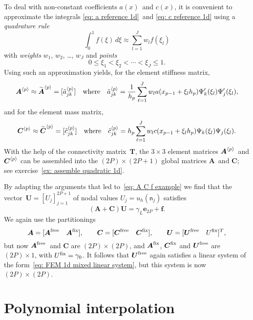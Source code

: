 To deal with non-constant coefficients $a(x)$~and $c(x)$, it is convenient to 
approximate the integrals \eqref{eq: a reference 1d}~and
\eqref{eq: c reference 1d} using a \emph{quadrature rule}
\[
\int_0^1 f(\xi)\,d\xi\approx\sum_{l=1}^J w_lf(\xi_l)
\]
with \emph{weights} $w_1$, $w_2$, \dots, $w_J$ and \emph{points}
\[
0\le\xi_1<\xi_2<\cdots<\xi_J\le1.
\]
Using such an approximation yields, for the element stiffness matrix,
\[
\boldsymbol{A}^{\langle p\rangle}\approx
	\widetilde{\boldsymbol{A}}^{\langle p\rangle}=[\tilde a_{jk}^{\langle p\rangle}]
\quad\text{where}\quad
\tilde a^{\langle p\rangle}_{jk}=\frac{1}{h_p}\sum_{\ell=1}^Jw_la(x_{p-1}+\xi_lh_p)
	\Psi'_k(\xi_l)\Psi'_j(\xi_l),
\]
and for the element mass matrix,
\[
\boldsymbol{C}^{\langle p\rangle}\approx
	\widetilde{\boldsymbol{C}}^{\langle p\rangle}=[\tilde c_{jk}^{\langle p\rangle}]
\quad\text{where}\quad
\tilde c^{\langle p\rangle}_{jk}=h_p\sum_{\ell=1}^Jw_lc(x_{p-1}+\xi_lh_p)
	\Psi_k(\xi_l)\Psi_j(\xi_l).
\]
With the help of the connectivity matrix~$\boldsymbol{T}$, the $3\times3$ 
element matrices $\boldsymbol{A}^{\langle p\rangle}$~and $\boldsymbol{C}^{\langle p\rangle}$ can be 
assembled into the $(2P)\times(2P+1)$ global matrices $\boldsymbol{A}$~and 
$\boldsymbol{C}$; see exercise~\ref{ex: assemble quadratic 1d}.

By adapting the arguments that led to~\eqref{eq: A C f example} we find that
the vector~$\boldsymbol{U}=[U_j]_{j=1}^{2P+1}$ of nodal values
$U_j=u_h(\mathsf{n}_j)$ satisfies
\[
(\boldsymbol{A}+\boldsymbol{C})\boldsymbol{U}
	=\gamma_L\boldsymbol{e}_{2P}+\boldsymbol{f}.
\]
We again use the partitionings
\[
\boldsymbol{A}=[\boldsymbol{A}^{\mathrm{free}}\quad\boldsymbol{A}^{\mathrm{fix}}],\qquad
\boldsymbol{C}=[\boldsymbol{C}^{\mathrm{free}}\quad\boldsymbol{C}^{\mathrm{fix}}],\qquad
\boldsymbol{U}=[\boldsymbol{U}^{\mathrm{free}}\quad U^{\mathrm{fix}}]^T,
\]
but now $\boldsymbol{A}^{\mathrm{free}}$~and $\boldsymbol{C}$ are $(2P)\times(2P)$, and
$\boldsymbol{A}^{\mathrm{fix}}$, $\boldsymbol{C}^{\mathrm{fix}}$ and $\boldsymbol{U}^{\mathrm{free}}$ are 
$(2P)\times1$, with $U^{\mathrm{fix}}=\gamma_0$.  It follows that $\boldsymbol{U}^{\mathrm{free}}$ 
again satisfies a linear system of the 
form~\eqref{eq: FEM 1d mixed linear system}, but this system is now 
$(2P)\times(2P)$.

\section{Polynomial interpolation}

